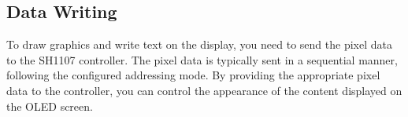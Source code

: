 \subsection{Data Writing}
To draw graphics and write text on the display, you need to send the pixel data to the SH1107 controller. The pixel data is typically sent in a sequential manner, following the configured addressing mode. By providing the appropriate pixel data to the controller, you can control the appearance of the content displayed on the OLED screen.


